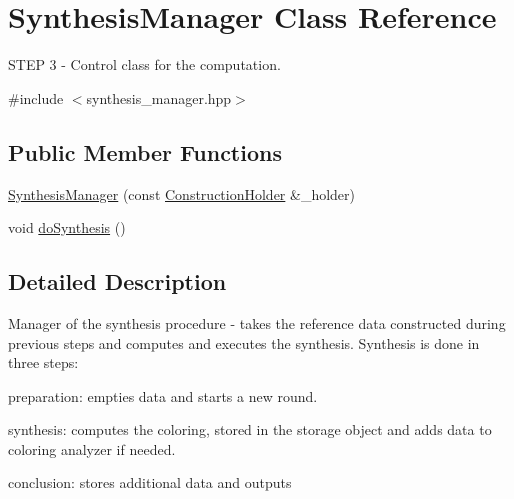 \hypertarget{classSynthesisManager}{\section{\-Synthesis\-Manager \-Class \-Reference}
\label{classSynthesisManager}
}


\-S\-T\-E\-P 3 -\/ \-Control class for the computation.  




{\ttfamily \#include $<$synthesis\-\_\-manager.\-hpp$>$}

\subsection*{\-Public \-Member \-Functions}
\begin{DoxyCompactItemize}
\item 
\hyperlink{classSynthesisManager_adad655ed16249bcfd9ac67afebfd507f}{\-Synthesis\-Manager} (const \hyperlink{classConstructionHolder}{\-Construction\-Holder} \&\-\_\-holder)
\item 
void \hyperlink{classSynthesisManager_a2ec413741cc5a8c1f4f96928abc71012}{do\-Synthesis} ()
\end{DoxyCompactItemize}


\subsection{\-Detailed \-Description}
\-Manager of the synthesis procedure -\/ takes the reference data constructed during previous steps and computes and executes the synthesis. \-Synthesis is done in three steps\-:
\begin{DoxyEnumerate}
\item preparation\-: empties data and starts a new round.
\end{DoxyEnumerate}

synthesis\-: computes the coloring, stored in the storage object and adds data to coloring analyzer if needed.
\begin{DoxyEnumerate}
\item conclusion\-: stores additional data and outputs 
\end{DoxyEnumerate}

